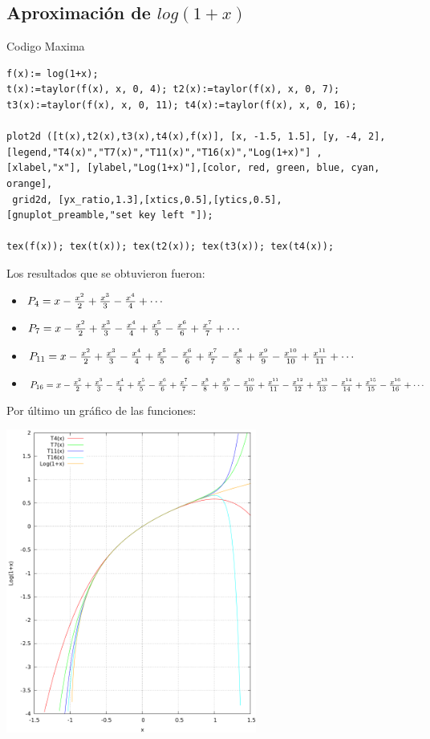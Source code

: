 \documentclass[12pt]{article}
\begin{document}
\subsection{Aproximación de $log(1+x)$}
Codigo Maxima
\begin{verbatim}
f(x):= log(1+x);
t(x):=taylor(f(x), x, 0, 4); t2(x):=taylor(f(x), x, 0, 7);
t3(x):=taylor(f(x), x, 0, 11); t4(x):=taylor(f(x), x, 0, 16);

plot2d ([t(x),t2(x),t3(x),t4(x),f(x)], [x, -1.5, 1.5], [y, -4, 2],
[legend,"T4(x)","T7(x)","T11(x)","T16(x)","Log(1+x)"] ,
[xlabel,"x"], [ylabel,"Log(1+x)"],[color, red, green, blue, cyan, orange],
 grid2d, [yx_ratio,1.3],[xtics,0.5],[ytics,0.5],
[gnuplot_preamble,"set key left "]);

tex(f(x)); tex(t(x)); tex(t2(x)); tex(t3(x)); tex(t4(x));
\end{verbatim}
Los resultados que se obtuvieron fueron:
\begin{itemize}
\item{$P_4=x-{{x^2}\over{2}}+{{x^3}\over{3}}-{{x^4}\over{4}}+\cdots $}
\item{$P_7=x-{{x^2}\over{2}}+{{x^3}\over{3}}-{{x^4}\over{4}}+{{x^5}\over{5}}-{{x^6}\over{6}}+{{x^7}\over{7}}+\cdots $}
\item{$P_{11}=x-{{x^2}\over{2}}+{{x^3}\over{3}}-{{x^4}\over{4}}+{{x^5}\over{5}}-{{x^6}\over{6}}+{{x^7}\over{7}}-{{x^8}\over{8}}+{{x^9}\over{9}}-{{x^{10}}\over{10}}+{{x^{11}}\over{11}}+\cdots$}
\item{$P_{16}=x-{{x^2}\over{2}}+{{x^3}\over{3}}-{{x^4}\over{4}}+{{x^5}\over{5}}-{{x^6}\over{6}}+{{x^7}\over{7}}-{{x^8}\over{8}}+{{x^9}\over{9}}-{{x ^{10}}\over{10}}+{{x^{11}}\over{11}}-{{x^{12}}\over{12}}+{{x^{13}}\over{13}}-{{x^{14}}\over{14}}+{{x^{15}}\over{15}}-{{x^{16}}\over{16}}+\cdots $}
\end{itemize}
Por último un gráfico de las funciones:
\begin{center}
\includegraphics[height=10cm]{TaylorLog(1+x)}
\end{center}
\pagebreak
\end{document}
